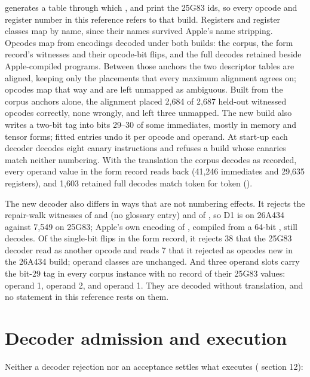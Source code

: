  generates a table through which ,  and  print
the 25G83 ids, so every opcode and register number in this reference refers to that build. Registers and register
classes map by name, since their names survived Apple's name stripping. Opcodes map from  encodings decoded under
both builds: the corpus, the form record's witnesses and their opcode-bit flips, and the full decodes retained beside
Apple-compiled programs. Between those anchors the two descriptor tables are aligned, keeping only the placements that
every maximum alignment agrees on;  opcodes map that way and  are left unmapped as ambiguous. Built from the
corpus anchors alone, the alignment placed 2,684 of 2,687 held-out witnessed opcodes correctly, none wrongly, and left
three unmapped. The new build also writes a two-bit tag into bits 29--30 of some immediates, mostly in memory and
tensor forms;  fitted entries undo it per opcode and operand. At start-up each decoder decodes eight canary
instructions and refuses a build whose canaries match neither numbering. With the translation the corpus decodes as
recorded, every operand value in the form record reads back (41,246 immediates and 29,635 registers), and 1,603
retained full decodes match token for token ().

The new decoder also differs in ways that are not numbering effects. It rejects the repair-walk witnesses of
 and  (no glossary entry) and of , so D1 is  on
26A434 against 7,549 on 25G83; Apple's own encoding of , compiled from a 64-bit , still
decodes. Of the single-bit flips in the form record, it rejects 38 that the 25G83 decoder read as another opcode and
reads 7 that it rejected as opcodes new in the 26A434 build; operand classes are unchanged. And three operand slots
carry the bit-29 tag in every corpus instance with no record of their 25G83 values:  operand 1,  operand 2, and
 operand 1. They are decoded without translation, and no statement in this reference rests on them.

\section{Decoder admission and execution}\label{sec:admission-decodes-executes}

Neither a decoder rejection nor an acceptance settles what executes ( section 12):

